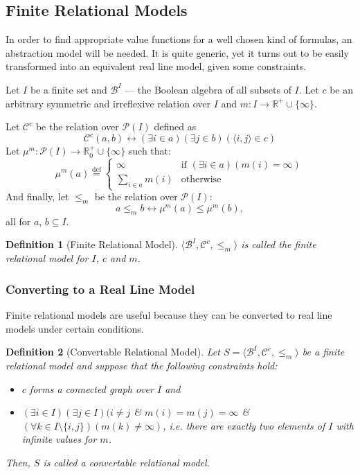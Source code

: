 \documentclass{article}
\newtheorem*{definition}{Definition}
\newcommand{\R}{\mathbb{R}}
\newcommand{\pwrset}{\mathcal{P}}
\newcommand{\B}{\mathcal{B}}
\newcommand{\eqdef}{\stackrel{\text{def}}{=}}
\begin{document}
\subsection{Finite Relational Models}
In order to find appropriate value functions for a well chosen kind of formulas, an abstraction model will be needed. It is quite generic, yet it turns out to be easily transformed into an equivalent real line model, given some constraints.

Let $I$ be a finite set and $\B^I$ --- the Boolean algebra of all subsets of $I$. Let $c$ be an arbitrary symmetric and irreflexive relation over $I$ and $m: I \rightarrow \R^+ \cup \{\infty\}$.

Let $\mathcal{C}^c$ be the relation over $\pwrset(I)$ defined as
\begin{equation*}
  \mathcal{C}^c(a, b) \longleftrightarrow (\exists i \in a)(\exists j \in b)(\langle i, j \rangle \in c)
\end{equation*}
Let $\mu^m: \pwrset(I) \rightarrow \R_0^+ \cup \{\infty\}$ such that:
\begin{equation*}
  \mu^m(a) \eqdef
  \begin{cases}
    \infty           & \text{if $(\exists i \in a)(m(i) = \infty)$} \\
    \sum_{i \in a}m(i) & \text{otherwise}
  \end{cases}
\end{equation*}
And finally, let $\leq_m$ be the relation over $\pwrset(I)$:
\begin{equation*}
  a \leq_m b \longleftrightarrow \mu^m(a) \leq \mu^m(b),
\end{equation*}
all for $a$, $b \subseteq I$.
\begin{definition}[Finite Relational Model]
$\langle \B^I, \mathcal{C}^c, \leq_m \rangle$ is called the \emph{finite relational model for $I$, $c$ and $m$}.
\end{definition}

\subsubsection{Converting to a Real Line Model}
Finite relational models are useful because they can be converted to real line models under certain conditions.

\begin{definition}[Convertable Relational Model]
Let $S = \langle \B^I, \mathcal{C}^c, \leq_m \rangle$ be a finite relational model and suppose that the following constraints hold:
\begin{itemize}
\item $c$ forms a connected graph over $I$ and
\item $(\exists i \in I)(\exists j \in I)(i \neq j$ \& $m(i) = m(j) = \infty$ \& $(\forall k \in I\setminus\{i, j\})(m(k) \neq \infty)$, i.e. there are exactly two elements of $I$ with infinite values for $m$.
\end{itemize}
Then, $S$ is called a \emph{convertable relational model}.
\end{definition}
\end{document}
